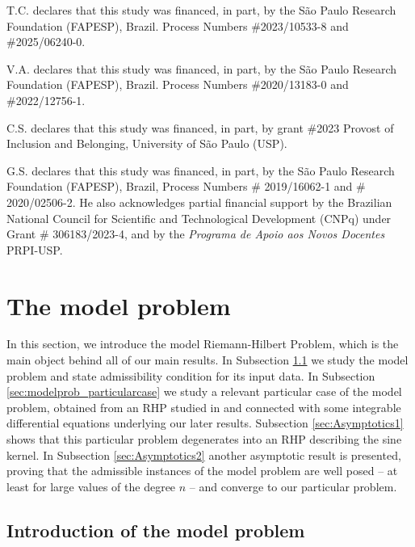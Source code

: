 \documentclass[reqno,a4paper,11pt]{amsart}
\theoremstyle{definition}
\theoremstyle{remark}
\numberwithin{equation}{section}
\begin{document}
T.C. declares that this study was financed, in part, by the São Paulo Research Foundation (FAPESP), Brazil. Process Numbers \#2023/10533-8 and \#2025/06240-0.

V.A. declares that this study was financed, in part, by the São Paulo Research Foundation (FAPESP), Brazil. Process Numbers \#2020/13183-0 and \#2022/12756-1.

C.S. declares that this study was financed, in part, by grant \#2023 Provost of Inclusion and Belonging, University of São Paulo (USP).

G.S. declares that this study was financed, in part, by the São Paulo Research Foundation (FAPESP), Brazil, Process Numbers \# 2019/16062-1 and \# 2020/02506-2. He also acknowledges partial financial support by the Brazilian National Council for Scientific and Technological Development (CNPq) under Grant \# 306183/2023-4, and by the {\it Programa de Apoio aos Novos Docentes} PRPI-USP.



\section{The model problem}\label{sec:ModelProblem}

In this section, we introduce the model Riemann-Hilbert Problem, which is the main object behind all of our main results. In Subsection \ref{sec:intromodel} we study the model problem and state admissibility condition for its input data. In Subsection \ref{sec:modelprob_particularcase} we study a relevant particular case of the model problem, obtained from an RHP studied in \cite{ClaeysTarricone24} and connected with some integrable differential equations underlying our later results. Subsection \ref{sec:Asymptotics1} shows that this particular problem degenerates into an RHP describing the sine kernel. In Subsection \ref{sec:Asymptotics2} another asymptotic result is presented, proving that the admissible instances of the model problem are well posed -- at least for large values of the degree $n$ -- and converge to our particular problem.


\subsection{Introduction of the model problem}\label{sec:intromodel}

\hfill 
\end{document}
